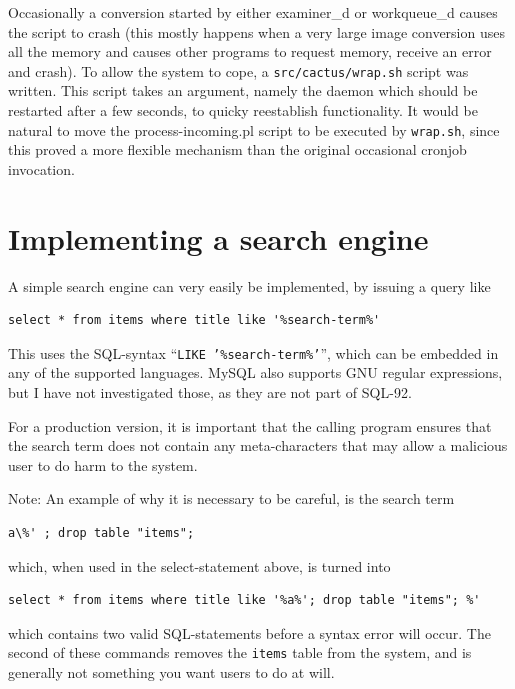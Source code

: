 Occasionally a conversion started by either examiner_d or workqueue_d
causes the script to crash (this mostly happens when a very large
image conversion uses all the memory and causes other programs to
request memory, receive an error and crash).   To allow the system to
cope, a \texttt{src/cactus/wrap.sh} script was written.  This script
takes an argument, namely the daemon which should be restarted after a
few seconds, to quicky reestablish functionality.  It would be natural
to move the process-incoming.pl script to be executed by
\texttt{wrap.sh}, since this proved a more flexible mechanism than the
original occasional cronjob invocation.

\section{Implementing a search engine}

A simple search engine can very easily be implemented, by issuing a
query like

\begin{verbatim}
select * from items where title like '%search-term%'
\end{verbatim}

This uses the SQL-syntax ``\texttt{LIKE '\%search-term\%'}'', which
can be embedded in any of the supported languages.   MySQL also
supports GNU regular expressions, but I have not investigated those,
as they are not part of SQL-92.


For a production version, it is important that the calling program
ensures that the search term does not contain any meta-characters that
may allow a malicious user to do harm to the system.

Note: An example of why it is necessary to be careful, is the search
term
\begin{verbatim}
a\%' ; drop table "items";
\end{verbatim}

which, when used in the select-statement above,
is turned into
\begin{verbatim}
select * from items where title like '%a%'; drop table "items"; %'
\end{verbatim}
which contains two valid SQL-statements before a syntax error will
occur.  The second of these commands removes the \texttt{items} table
from the system, and is generally not something you want users to do
at will.

